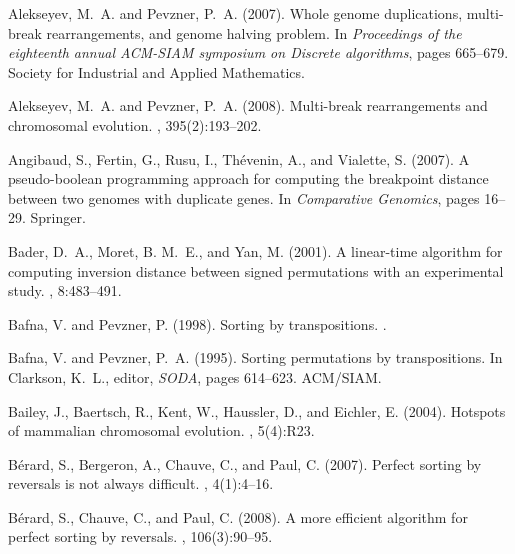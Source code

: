 \documentclass[11pt,final,twoside,nofrench]{thlifl}
\begin{document}
\begin{thebibliography}{}

Alekseyev, M.~A. and Pevzner, P.~A. (2007).
\newblock Whole genome duplications, multi-break rearrangements, and genome
  halving problem.
\newblock In {\em Proceedings of the eighteenth annual ACM-SIAM symposium on
  Discrete algorithms}, pages 665--679. Society for Industrial and Applied
  Mathematics.

Alekseyev, M.~A. and Pevzner, P.~A. (2008).
\newblock Multi-break rearrangements and chromosomal evolution.
, 395(2):193--202.

Angibaud, S., Fertin, G., Rusu, I., Th{\'e}venin, A., and Vialette, S. (2007).
\newblock A pseudo-boolean programming approach for computing the breakpoint
  distance between two genomes with duplicate genes.
\newblock In {\em Comparative Genomics}, pages 16--29. Springer.

Bader, D.~A., Moret, B. M.~E., and Yan, M. (2001).
\newblock A linear-time algorithm for computing inversion distance between
  signed permutations with an experimental study.
, 8:483--491.

Bafna, V. and Pevzner, P. (1998).
\newblock Sorting by transpositions.
.

Bafna, V. and Pevzner, P.~A. (1995).
\newblock Sorting permutations by transpositions.
\newblock In Clarkson, K.~L., editor, {\em SODA}, pages 614--623. ACM/SIAM.

Bailey, J., Baertsch, R., Kent, W., Haussler, D., and Eichler, E. (2004).
\newblock Hotspots of mammalian chromosomal evolution.
, 5(4):R23.

B{\'e}rard, S., Bergeron, A., Chauve, C., and Paul, C. (2007).
\newblock Perfect sorting by reversals is not always difficult.
, 4(1):4--16.

B{\'e}rard, S., Chauve, C., and Paul, C. (2008).
\newblock A more efficient algorithm for perfect sorting by reversals.
, 106(3):90--95.


\end{thebibliography}
\end{document}
